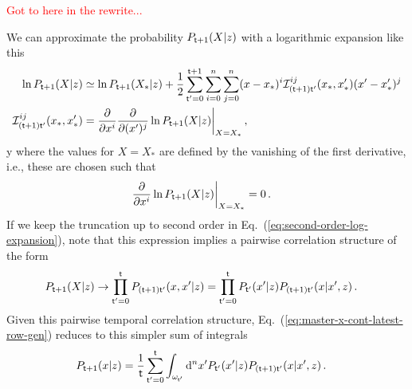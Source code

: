 \textcolor{red}{Got to here in the rewrite...}

We can approximate the probability $P_{{\sf t}+1}(X\vert z)$ with a logarithmic expansion like this
\begin{align}
\ln P_{{\sf t}+1}(X\vert z) &\simeq \ln P_{{\sf t}+1}(X_*\vert z) + \frac{1}{2}\sum_{{\sf t}'=0}^{{\sf t}+1}\sum_{i=0}^{n}\sum_{j=0}^{n} (x-x_*)^i {\cal I}^{ij}_{({\sf t}+1){\sf t}'}(x_*,x'_*) (x'-x'_*)^j \label{eq:second-order-log-expansion} \\
{\cal I}^{ij}_{({\sf t}+1){\sf t}'}(x_*,x'_*) &= \frac{\partial}{\partial x^i}\frac{\partial}{\partial (x')^j}\ln P_{{\sf t}+1}(X\vert z) \bigg\vert_{X=X_*} \,,
\end{align}y
where the values for $X=X_*$ are defined by the vanishing of the first derivative, i.e., these are chosen such that
\begin{align}
\frac{\partial}{\partial x^i}\ln P_{{\sf t}+1}(X\vert z) \bigg\vert_{X=X_*} &= 0 \,.
\end{align}
If we keep the truncation up to second order in Eq.~(\ref{eq:second-order-log-expansion}), note that this expression implies a pairwise correlation structure of the form
\begin{align}
P_{{\sf t}+1}(X\vert z) &\rightarrow \prod_{{\sf t}'=0}^{{\sf t}}P_{({\sf t}+1){\sf t}'}(x,x'\vert z) = \prod_{{\sf t}'=0}^{{\sf t}}P_{{\sf t}'}(x'\vert z)P_{({\sf t}+1){\sf t}'}(x\vert x', z) \,.
\end{align}
Given this pairwise temporal correlation structure, Eq.~(\ref{eq:master-x-cont-latest-row-gen}) reduces to this simpler sum of integrals
\begin{align}
P_{{\sf t}+1}(x\vert z) &= \frac{1}{{\sf t}}\sum_{{\sf t}'=0}^{{\sf t}}\int_{\omega_{{\sf t}'}}{\rm d}^nx' P_{{\sf t}'}(x'\vert z)P_{({\sf t}+1){\sf t}'}(x\vert x',z) \label{eq:second-order-correl} \,.
\end{align}

